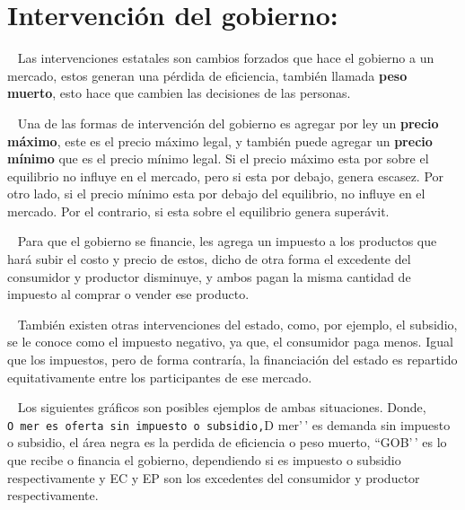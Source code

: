 \documentclass[
  letterpaper,
  DIV=11,
  numbers=noendperiod]{scrreport}
\begin{document}
\hypertarget{intervenciuxf3n-del-gobierno}{%
\section{Intervención del
gobierno:}\label{intervenciuxf3n-del-gobierno}}

~ Las intervenciones estatales son cambios forzados que hace el gobierno
a un mercado, estos generan una pérdida de eficiencia, también llamada
\textbf{peso muerto}, esto hace que cambien las decisiones de las
personas.

~ Una de las formas de intervención del gobierno es agregar por ley un
\textbf{precio máximo}, este es el precio máximo legal, y también puede
agregar un \textbf{precio mínimo} que es el precio mínimo legal. Si el
precio máximo esta por sobre el equilibrio no influye en el mercado,
pero si esta por debajo, genera escasez. Por otro lado, si el precio
mínimo esta por debajo del equilibrio, no influye en el mercado. Por el
contrario, si esta sobre el equilibrio genera superávit.

~ Para que el gobierno se financie, les agrega un impuesto a los
productos que hará subir el costo y precio de estos, dicho de otra forma
el excedente del consumidor y productor disminuye, y ambos pagan la
misma cantidad de impuesto al comprar o vender ese producto.

~ También existen otras intervenciones del estado, como, por ejemplo, el
subsidio, se le conoce como el impuesto negativo, ya que, el consumidor
paga menos. Igual que los impuestos, pero de forma contraría, la
financiación del estado es repartido equitativamente entre los
participantes de ese mercado.

~ Los siguientes gráficos son posibles ejemplos de ambas situaciones.
Donde,
\texttt{O\ mer\textquotesingle{}\textquotesingle{}\ es\ oferta\ sin\ impuesto\ o\ subsidio,}D
mer'\,' es demanda sin impuesto o subsidio, el área negra es la perdida
de eficiencia o peso muerto, ``GOB'\,' es lo que recibe o financia el
gobierno, dependiendo si es impuesto o subsidio respectivamente y EC y
EP son los excedentes del consumidor y productor respectivamente.
\end{document}
